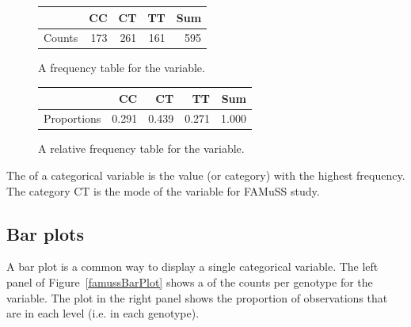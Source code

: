 \begin{figure}[ht]
	\centering
	\begin{tabular}{rrrrr}
		\hline
		& CC & CT & TT & Sum \\ 
		\hline
		Counts & 173 & 261 & 161 & 595 \\ 
		\hline
	\end{tabular}
	\caption{A frequency table for the  variable.} 
	\label{famussFrequencyTable}
\end{figure}

\begin{figure}[ht]
	\centering
	\begin{tabular}{rrrrr}
		\hline
		& CC & CT & TT & Sum \\ 
		\hline
		Proportions & 0.291 & 0.439 & 0.271 & 1.000 \\ 
		\hline
	\end{tabular}
	\caption{A relative frequency table for the  variable.} 
	\label{famussRelFrequencyTable}
\end{figure}


The  of a categorical variable is the value (or category) with the highest frequency. The category CT is the mode of the   variable for FAMuSS study.  


\subsection{Bar plots}
A bar plot is a common way to display a single categorical variable. The left panel of Figure~\ref{famussBarPlot} shows a  of the counts per genotype for the  variable. The plot in the right panel shows the proportion of observations that are in each level (i.e. in each genotype).

